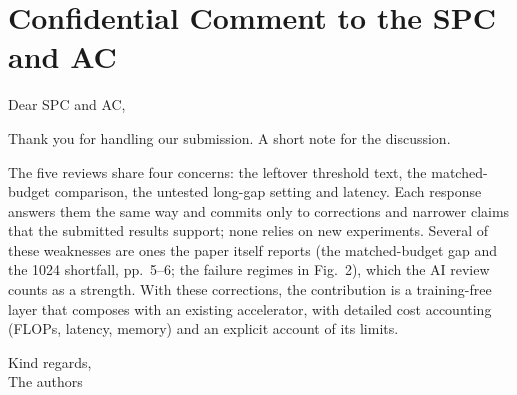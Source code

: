 \section*{Confidential Comment to the SPC and AC}

Dear SPC and AC,

Thank you for handling our submission. A short note for the discussion.

The five reviews share four concerns: the leftover threshold text, the matched-budget comparison, the untested long-gap setting and latency. Each response answers them the same way and commits only to corrections and narrower claims that the submitted results support; none relies on new experiments. Several of these weaknesses are ones the paper itself reports (the matched-budget gap and the 1024 shortfall, pp.~5--6; the failure regimes in Fig.~2), which the AI review counts as a strength. With these corrections, the contribution is a training-free layer that composes with an existing accelerator, with detailed cost accounting (FLOPs, latency, memory) and an explicit account of its limits.

Kind regards,\\
The authors
